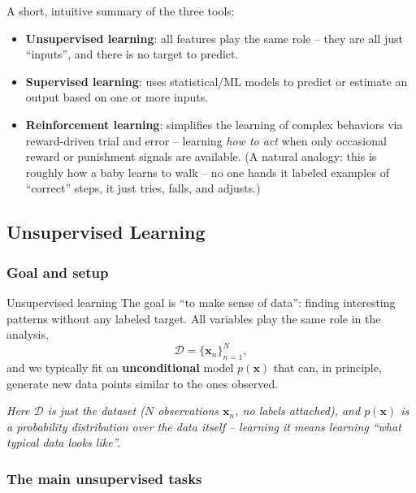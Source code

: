 A short, intuitive summary of the three tools:

\begin{itemize}
  \item \textbf{Unsupervised learning}: all features play the same role -- they are all just ``inputs'', and there is no target to predict.
  \item \textbf{Supervised learning}: uses statistical/ML models to predict or estimate an output based on one or more inputs.
  \item \textbf{Reinforcement learning}: simplifies the learning of complex behaviors via reward-driven trial and error -- learning \textit{how to act} when only occasional reward or punishment signals are available. (A natural analogy: this is roughly how a baby learns to walk -- no one hands it labeled examples of ``correct'' steps, it just tries, falls, and adjusts.)
\end{itemize}

\subsection{Unsupervised Learning}\label{sec:rl-intro-unsupervised}

\subsubsection{Goal and setup}

\begin{defbox}{Unsupervised learning}
The goal is ``to make sense of data'': finding interesting patterns without any labeled target. All variables play the same role in the analysis,
\[
  \mathcal{D} = \{\mathbf{x}_n\}_{n=1}^{N},
\]
and we typically fit an \textbf{unconditional} model $p(\mathbf{x})$ that can, in principle, generate new data points similar to the ones observed.

\textit{Here $\mathcal{D}$ is just the dataset ($N$ observations $\mathbf{x}_n$, no labels attached), and $p(\mathbf{x})$ is a probability distribution over the data itself -- learning it means learning ``what typical data looks like''.}
\end{defbox}

\subsubsection{The main unsupervised tasks}


